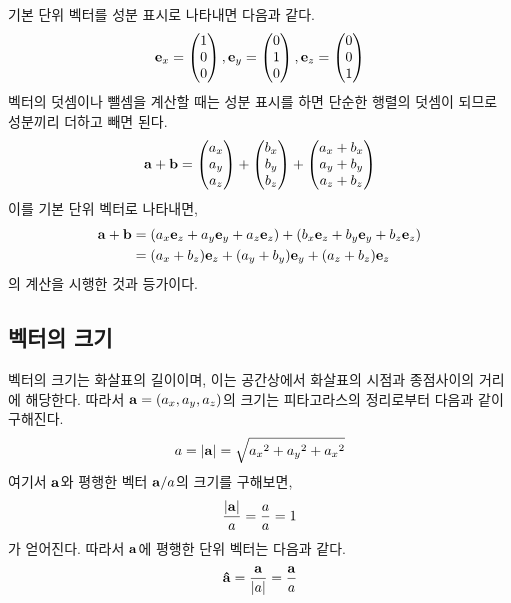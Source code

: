 \documentclass[a4paper,twoside,11pt]{book}
\begin{document}
기본 단위 벡터를 성분 표시로 나타내면 다음과 같다.
\[\vb{e}_x = \begin{pmatrix}
    1 \\
    0 \\
    0
  \end{pmatrix}, \vb{e}_y = \begin{pmatrix}
    0 \\
    1 \\
    0
  \end{pmatrix}, \vb{e}_z = \begin{pmatrix}
    0 \\
    0 \\
    1
  \end{pmatrix}
\]
벡터의 덧셈이나 뺄셈을 계산할 때는 성분 표시를 하면 단순한 행렬의 덧셈이 되므로 성분끼리 더하고 빼면 된다.
\[
  \vb{a}+\vb{b} = \begin{pmatrix}
    a_x \\
    a_y \\
    a_z
  \end{pmatrix} + \begin{pmatrix}
    b_x \\
    b_y \\
    b_z
  \end{pmatrix} + \begin{pmatrix}
    a_x + b_x \\
    a_y + b_y \\
    a_z + b_z
  \end{pmatrix}
\]
이를 기본 단위 벡터로 나타내면,
\begin{align*}
  \vb{a} + \vb{b} & = (a_x\vb{e}_z + a_y\vb{e}_y + a_z\vb{e}_z) + (b_x\vb{e}_z + b_y\vb{e}_y + b_z\vb{e}_z) \\
                  & = (a_x + b_z)\vb{e}_z + (a_y + b_y)\vb{e}_y + (a_z + b_z)\vb{e}_z
\end{align*}
의 계산을 시행한 것과 등가이다.

\subsection{벡터의 크기}

벡터의 크기는 화살표의 길이이며, 이는 공간상에서 화살표의 시점과 종점사이의 거리에 해당한다. 따라서 $\vb{a} = (a_x,a_y,a_z)$의 크기는 피타고라스의 정리로부터 다음과 같이 구해진다.
\[a=\abs{\vb{a}} = \sqrt{{a_x}^2+{a_y}^2+{a_x}^2}\]
여기서 $\vb{a}$와 평행한 벡터 $\vb{a}/a$의 크기를 구해보면,
\[\frac{\abs{\vb{a}}}{a} = \frac{a}{a} = 1\]
가 얻어진다. 따라서 $\vb{a}$에 평행한 단위 벡터는 다음과 같다.
\[\vu{a} = \frac{\vb{a}}{\abs{a}} = \frac{\vb{a}}{a}\]
\end{document}
